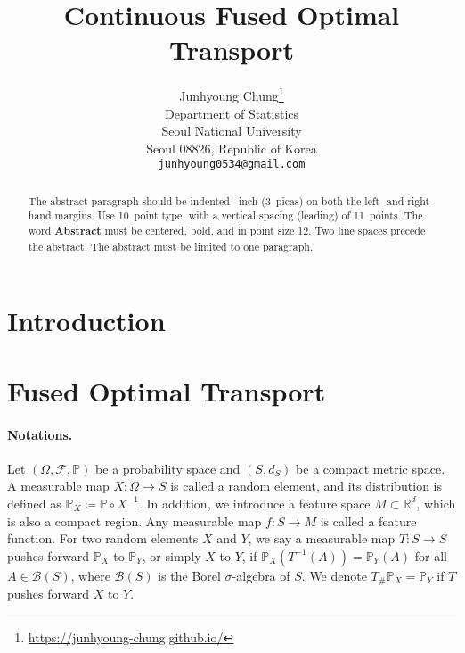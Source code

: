 \documentclass{article}
\title{Continuous Fused Optimal Transport}
\author{%
  Junhyoung Chung\thanks{\href{https://junhyoung-chung.github.io/}{https://junhyoung-chung.github.io/}} \\
  Department of Statistics\\
  Seoul National University\\
  Seoul 08826, Republic of Korea \\
  \texttt{junhyoung0534@gmail.com} \\
}
\begin{document}
\maketitle


\begin{abstract}
  The abstract paragraph should be indented ~inch (3~picas) on
  both the left- and right-hand margins. Use 10~point type, with a vertical
  spacing (leading) of 11~points.  The word \textbf{Abstract} must be centered,
  bold, and in point size 12. Two line spaces precede the abstract. The abstract
  must be limited to one paragraph.
\end{abstract}


\section{Introduction}

\section{Fused Optimal Transport}
\paragraph{Notations.} Let $(\Omega,\mathcal{F},\mathbb{P})$ be a probability space and $(S,d_S)$ be a compact metric space. A measurable map $X: \Omega \to S$ is called a random element, and its distribution is defined as $\mathbb{P}_X \coloneqq \mathbb{P} \circ X^{-1}$. In addition, we introduce a feature space $M \subset \mathbb{R}^d$, which is also a compact region. Any measurable map $f : S \to M$ is called a feature function.
For two random elements $X$ and $Y$, we say a measurable map $T: S \to S$ pushes forward $\mathbb{P}_X$ to $\mathbb{P}_Y$, or simply $X$ to $Y$, if $\mathbb{P}_X(T^{-1}(A)) = \mathbb{P}_Y(A)$ for all $A \in \mathcal{B}(S)$, where $\mathcal{B}(S)$ is the Borel $\sigma$-algebra of $S$. We denote $T_{\#}\mathbb{P}_X = \mathbb{P}_Y$ if $T$ pushes forward $X$ to $Y$.
\end{document}
